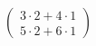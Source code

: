 \documentclass[preview]{standalone}
\begin{document}
\begin{align*}
\begin{pmatrix}3 \cdot 2 + 4 \cdot 1 \\ 5 \cdot 2 + 6 \cdot 1\end{pmatrix}
\end{align*}
\end{document}
